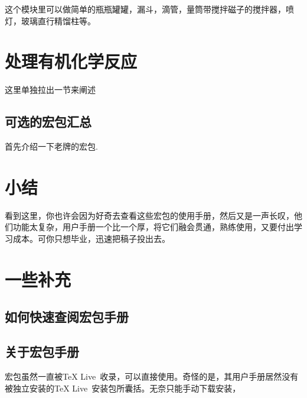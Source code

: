 \documentclass[a4paper,UTF8,zihao = -4]{ctexart} %
\begin{document}

这个模块里可以做简单的瓶瓶罐罐，漏斗，滴管，量筒带搅拌磁子的搅拌器，喷灯，玻璃直行精馏柱等。


\section{处理有机化学反应}
\label{sec:organic}

这里单独拉出一节来阐述

\subsection{可选的宏包汇总}
\label{sec:OrganSummary}

首先介绍一下老牌的\XyMTeX{}宏包.

\section*{小结}
\label{sec:conclusion}

看到这里，你也许会因为好奇去查看这些宏包的使用手册，然后又是一声长叹，他们功能太复杂，用户手册一个比一个厚，将它们融会贯通，熟练使用，又要付出学习成本。可你只想毕业，迅速把稿子投出去。

\section*{一些补充}
\label{sec:miscellaneous}


\subsection*{如何快速查阅宏包手册}
\label{sec:texdoc}



\subsection*{关于\XyMTeX{}宏包手册} %
\label{sec:xymtexDoc}
\XyMTeX{}宏包虽然一直被\TeX{} Live~收录，可以直接使用。奇怪的是，其用户手册居然没有被独立安装的\TeX{} Live~安装包所囊括。无奈只能手动下载安装，
\end{document}
